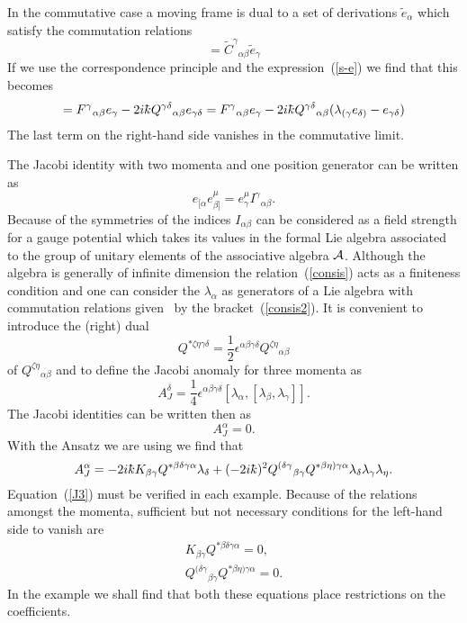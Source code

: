 \documentclass[12pt,a4paper]{article}
\newcounter{eg}
\def\t#1{\tilde #1}
\def\c#1{{\cal #1}}
\def\kbar{{\mathchar'26\mkern-9muk}}
\begin{document}
In the commutative case a moving frame is dual to a set of derivations
$\t{e}_\alpha$ which satisfy the commutation relations
\begin{equation}
[\t{e}_\alpha, \t{e}_\beta] = 
\t{C}^\gamma{}_{\alpha\beta}\t{e}_\gamma             \label{te-te}
\end{equation}
If we use the correspondence principle and the
expression~(\ref{s-e}) we find that this becomes
\begin{equation}
[e_\alpha, e_\beta] = F^\gamma{}_{\alpha\beta} e_\gamma -
2i\kbar Q^{\gamma\delta}{}_{\alpha\beta} e_{\gamma\delta}  
= F^\gamma{}_{\alpha\beta} e_\gamma -
2i\kbar Q^{\gamma\delta}{}_{\alpha\beta} 
(\lambda_{(\gamma} e_{\delta)} - e_{\gamma\delta})              \label{sc2}
\end{equation}
The last term on the right-hand side vanishes in the commutative limit.

The Jacobi identity with two momenta and one position generator can be
written as
\begin{equation}
e_{[\alpha} e^\mu_{\beta]} = 
e^\mu_\gamma I^\gamma{}_{\alpha\beta}.                           \label{G-C}
\end{equation}
Because of the symmetries of the indices $I_{\alpha\beta}$ can be
considered as a field strength for a gauge potential which takes its
values in the formal Lie algebra associated to the group of unitary
elements of the associative algebra $\c{A}$. Although the algebra is
generally of infinite dimension the relation~(\ref{consis}) acts as a
finiteness condition and one can consider the $\lambda_\alpha$ as
generators of a Lie algebra with commutation relations
given~\cite{DimMad96,JurMolSchSchWes01} by the
bracket~(\ref{consis2}). It is convenient to introduce the (right) dual
$$
Q^{*\zeta\eta\gamma\delta} =
\frac{1}{2} \epsilon^{\alpha\beta\gamma\delta}
Q^{\zeta\eta}{}_{\alpha\beta}
$$
of $Q^{\zeta\eta}{}_{\alpha\beta}$ and to define the Jacobi anomaly
for three momenta as
$$
A_J^\delta = \frac 14\epsilon^{\alpha\beta\gamma\delta}
[\lambda_\alpha,[\lambda_\beta,\lambda_\gamma]].
$$
The Jacobi identities can be written then as
\begin{equation}
A_J^\alpha = 0.                                              \label{J3}
\end{equation}
With the Ansatz we are using we find that
$$
A_J^\alpha =
-2i\kbar K_{\beta\gamma}Q^{*\beta\delta\gamma\alpha}\lambda_\delta
+ (-2i\kbar)^2 Q^{(\delta\gamma}{}_{\beta\gamma}
Q^{*\beta\eta)\gamma\alpha} \lambda_\delta\lambda_\gamma\lambda_\eta.
$$
Equation~(\ref{J3}) must be verified in each example. 
Because of the relations amongst the momenta, sufficient but not
necessary conditions for the left-hand side to vanish are
\begin{eqnarray}
K_{\beta\gamma}Q^{*\beta\delta\gamma\alpha} = 0,          \label{jac1}\\[6pt]
Q^{(\delta\gamma}{}_{\beta\gamma}
Q^{*\beta\eta)\gamma\alpha} = 0.                        \label{jac2}
\end{eqnarray}
In the example we shall find that both these equations place
restrictions on the coefficients.
\end{document}

